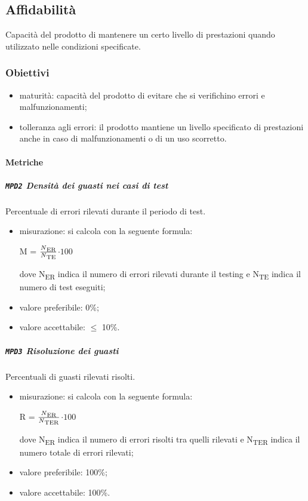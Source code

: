 	\subsection{Affidabilità}
	Capacità del prodotto di mantenere un certo livello di prestazioni quando utilizzato nelle condizioni specificate.
		\subsubsection{Obiettivi}
		\begin{itemize}
			\item maturità: capacità del prodotto di evitare che si verifichino errori e malfunzionamenti;
			\item tolleranza agli errori: il prodotto mantiene un livello specificato di prestazioni anche in caso di malfunzionamenti o di un uso scorretto.
		\end{itemize}
		\paragraph{Metriche}
			\subparagraph{\texttt{MPD2} Densità dei guasti nei casi di test}
			Percentuale di errori rilevati durante il periodo di test.
			\begin{itemize}
			\item misurazione: si calcola con la seguente formula: \\
			\centerline{ M =  \(\frac{N\textsubscript{ER}}{N\textsubscript{TE}} \)$ \cdot 100$ }
			dove N\textsubscript{ER} indica il numero di errori rilevati durante il testing e N\textsubscript{TE} indica il numero di test eseguiti;
			\item valore preferibile: 0\%;
			\item valore accettabile: $\leq$ 10\%.
			\end{itemize}
			\subparagraph{\texttt{MPD3} Risoluzione dei guasti}
			Percentuali di guasti rilevati risolti.
			\begin{itemize}
			\item misurazione: si calcola con la seguente formula: \\
			\centerline{ R =  \(\frac{N\textsubscript{ER}}{N\textsubscript{TER}} \)$ \cdot 100$ }
			dove N\textsubscript{ER} indica il numero di errori risolti tra quelli rilevati e N\textsubscript{TER} indica il numero totale di errori rilevati;
			\item valore preferibile: 100\%;
			\item valore accettabile: 100\%.
			\end{itemize}
